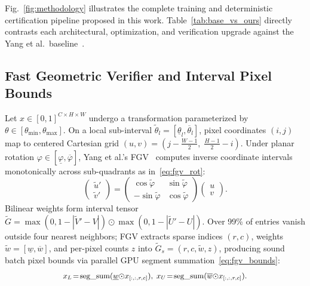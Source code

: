 \documentclass[conference]{IEEEtran}
\begin{document}
Fig.~\ref{fig:methodology} illustrates the complete training and
deterministic certification pipeline proposed in this work.
Table~\ref{tab:base_vs_ours} directly contrasts each architectural,
optimization, and verification upgrade against the Yang et al.\ baseline~\cite{b3}.

\subsection{Fast Geometric Verifier and Interval Pixel Bounds}
Let $x \in [0, 1]^{C \times H \times W}$ undergo a transformation
parameterized by $\theta \in [\theta_{\min}, \theta_{\max}]$.
On a local sub-interval
$\tilde{\theta}_l = [\underline{\theta}_l, \overline{\theta}_l]$,
pixel coordinates $(i, j)$ map to centered Cartesian grid
$(u, v) = (j - \frac{W-1}{2},\; \frac{H-1}{2} - i)$.
Under planar rotation $\varphi \in [\underline{\varphi}, \overline{\varphi}]$,
Yang et al.'s FGV~\cite{b3} computes inverse coordinate intervals
monotonically across sub-quadrants as in~\eqref{eq:fgv_rot}:
\vspace{-3pt}
\begin{equation}
\begin{pmatrix} \tilde{u}' \\ \tilde{v}' \end{pmatrix}
=
\begin{pmatrix} \cos \tilde{\varphi} & \sin \tilde{\varphi} \\
                -\sin \tilde{\varphi} & \cos \tilde{\varphi} \end{pmatrix}
\begin{pmatrix} u \\ v \end{pmatrix}.
\label{eq:fgv_rot}
\end{equation}
\vspace{-3pt}
Bilinear weights form interval tensor
$\tilde{G} = \max(0, 1 - |\tilde{V}' - V|) \odot \max(0, 1 - |\tilde{U}' - U|)$.
Over 99\% of entries vanish outside four nearest neighbors; FGV extracts
sparse indices $(r, c)$, weights $\tilde{w} = [\underline{w}, \overline{w}]$,
and per-pixel counts $z$ into $\tilde{G}_s = (r, c, \tilde{w}, z)$,
producing sound batch pixel bounds via parallel GPU segment summation~\eqref{eq:fgv_bounds}:
\vspace{-3pt}
\begin{equation}
\mbox{\small $x_L\!=\!\mathrm{seg\_sum}(\underline{w}{\odot}x_{[:,:,r,c]}),\;
x_U\!=\!\mathrm{seg\_sum}(\overline{w}{\odot}x_{[:,:,r,c]}).$}
\label{eq:fgv_bounds}
\end{equation}
\end{document}
